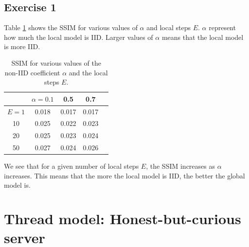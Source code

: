 \documentclass[12pt]{article}
\begin{document}
\subsection{Exercise 1}
Table \ref{tab:SSIM} shows the SSIM for various values of $\alpha$ and local steps $E$. $\alpha$ represent how much the local model is IID. Larger values of $\alpha$ means that the local model is more IID.
\begin{table}[h]
  \centering
  \begin{tabular}{c|c|c|c|c}
            & $\alpha = 0.1$ & 0.5   & 0.7   \\ \hline
    $E = 1$ & 0.018          & 0.017 & 0.017 \\
    10      & 0.025          & 0.022 & 0.023 \\
    20      & 0.025          & 0.023 & 0.024 \\
    50      & 0.027          & 0.024 & 0.026 \\
  \end{tabular}
  \caption{SSIM for various values of the non-IID coefficient $\alpha$ and the local steps $E$.}
  \label{tab:SSIM}
\end{table}
We see that for a given number of local steps $E$, the SSIM increases as $\alpha$ increases. This means that the more the local model is IID, the better the global model is.

\section{Thread model: Honest-but-curious server}
\end{document}
